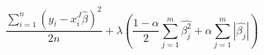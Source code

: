 $$\frac{\sum_{i=1}^n(y_i-x_i^J\hat{\beta})^2}{2n}+\lambda\left( \frac{1-\alpha}{2}\sum_{j=1}^m\hat{\beta^2_j}+\alpha\sum_{j=1}^m|\hat{\beta_j}|\right)$$
